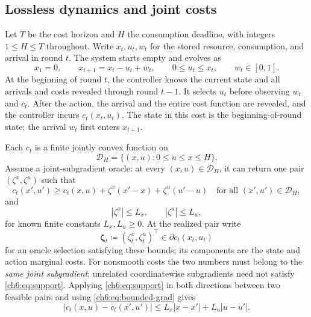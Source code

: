 \documentclass[11pt]{article}
\theoremstyle{plain}
\theoremstyle{remark}
\numberwithin{equation}{section}
\begin{document}
\subsection{Lossless dynamics and joint costs}
Let $T$ be the cost horizon and $H$ the consumption deadline, with integers
$1\le H\le T$ throughout.
Write $x_t,u_t,w_t$ for the stored resource, consumption, and arrival in
round $t$. The system starts empty and evolves as
\begin{equation}\label{ch6:eq:dynamics}
 x_1=0,\qquad x_{t+1}=x_t-u_t+w_t,\qquad
 0\le u_t\le x_t,\qquad w_t\in[0,1].
\end{equation}
At the beginning of round $t$, the controller knows the current state and
all arrivals and costs revealed through round $t-1$. It selects $u_t$ before
observing $w_t$ and $c_t$. After the action, the arrival and the entire cost
function are revealed, and the controller incurs $c_t(x_t,u_t)$.
The state in this cost is the beginning-of-round state; the arrival $w_t$
first enters $x_{t+1}$.

Each $c_t$ is a finite jointly convex function on
\begin{equation}\label{ch6:eq:domain}
 \mathcal{D}_H=\{(x,u):0\le u\le x\le H\}.
\end{equation}
Assume a joint-subgradient oracle: at every $(x,u)\in\mathcal{D}_H$, it can return
one pair $(\zeta^x,\zeta^u)$ such that
\begin{equation}\label{ch6:eq:support}
 c_t(x',u')\ge c_t(x,u)+\zeta^x(x'-x)+\zeta^u(u'-u)
 \quad\text{for all }(x',u')\in\mathcal{D}_H,
\end{equation}
and
\begin{equation}\label{ch6:eq:bounded-grad}
 |\zeta^x|\le L_x,\qquad |\zeta^u|\le L_u,
\end{equation}
for known finite constants $L_x,L_u\ge0$.
At the realized pair write
\begin{equation}\label{ch6:eq:actual-grad}
 \boldsymbol{\zeta}_t\coloneqq(\zeta_t^x,\zeta_t^u)^\top
 \in\partial c_t(x_t,u_t)
\end{equation}
for an oracle selection satisfying these bounds; its components are the state and action marginal costs.
For nonsmooth costs the two numbers must belong to the \emph{same joint
subgradient}; unrelated coordinatewise subgradients need not satisfy
\eqref{ch6:eq:support}.
Applying \eqref{ch6:eq:support} in both directions between two feasible
pairs and using \eqref{ch6:eq:bounded-grad} gives
\begin{equation}\label{ch6:eq:lipschitz}
 |c_t(x,u)-c_t(x',u')|\le L_x|x-x'|+L_u|u-u'|.
\end{equation}
\end{document}
